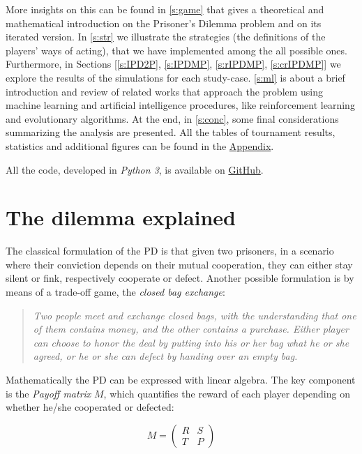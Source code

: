 \documentclass[journal,10pt,twoside]{IEEEtran}
\begin{document}
More insights on this can be found in \autoref{s:game} that gives a theoretical and mathematical introduction on the Prisoner's Dilemma problem and on its iterated version.
In \autoref{s:str} we illustrate the strategies (the definitions of the players' ways of acting), that we have implemented among the all possible ones.
Furthermore, in Sections [\ref{s:IPD2P}, \ref{s:IPDMP}, \ref{s:rIPDMP}, \ref{s:crIPDMP}] we explore the results of the simulations for each study-case.
\autoref{s:ml} is about a brief introduction and review of related works that approach the problem using machine learning and artificial intelligence procedures, like reinforcement learning and evolutionary algorithms.
At the end, in \autoref{s:conc}, some final considerations summarizing the analysis are presented.
All the tables of tournament results, statistics and additional figures can be found in the \hyperref[s:appendix]{Appendix}.

All the code, developed in \textit{Python 3}, is available on \href{https://github.com/eliabntt/LaboratoryOfComputationalPhysics/tree/Group9}{GitHub}.

\section{The dilemma explained} \label{s:game}
The classical formulation of the PD is that given two prisoners, in a scenario where their conviction depends on their mutual cooperation, they can either stay silent or fink, respectively cooperate or defect.
Another possible formulation is by means of a trade-off game, the \textit{closed bag exchange}:

\begin{quote}
\textit{Two people meet and exchange closed bags, with the understanding that one of them contains money, and the other contains a purchase. Either player can choose to honor the deal by putting into his or her bag what he or she agreed, or he or she can defect by handing over an empty bag.}
\end{quote}

Mathematically the PD can be expressed with linear algebra. The key component is the \textit{Payoff matrix} $M$, which quantifies the reward of each player depending on whether he/she cooperated or defected:

$$
M = 
\begin{pmatrix} 
R & S \\
T & P 
\end{pmatrix}
$$
\end{document}
